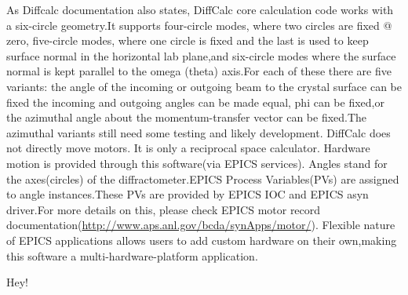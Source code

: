 \documentclass[letterpaper,10pt,english]{sphinxmanual}
\begin{document}
As Diffcalc documentation also states, DiffCalc core calculation code works with a six-circle geometry.It supports four-circle modes, where two circles are fixed @ zero, five-circle modes, where one circle is fixed and the last is used to keep surface normal in the horizontal lab plane,and six-circle modes where the surface normal is kept parallel to the omega (theta) axis.For each of these there are five variants: the angle of the incoming or outgoing beam to the crystal surface can be fixed the incoming and outgoing angles can be made equal, phi can be fixed,or the azimuthal angle about the momentum-transfer vector can be fixed.The azimuthal variants still need some testing and likely development.                                       
DiffCalc does not directly move motors. It is only a reciprocal space calculator. Hardware motion is provided through this software(via EPICS services). Angles stand for the axes(circles) of the diffractometer.EPICS Process Variables(PVs) are assigned to angle instances.These PVs are provided by EPICS IOC and EPICS asyn driver.For more details on this, please check EPICS motor record documentation(\href{http://www.aps.anl.gov/bcda/synApps/motor/}{http://www.aps.anl.gov/bcda/synApps/motor/}). Flexible nature of EPICS applications allows users to add custom hardware on their own,making this software a multi-hardware-platform application.

\begin{fulllineitems}
\label{Manual:Diffractometer.Angle}
Hey!

\end{fulllineitems}

\end{document}
